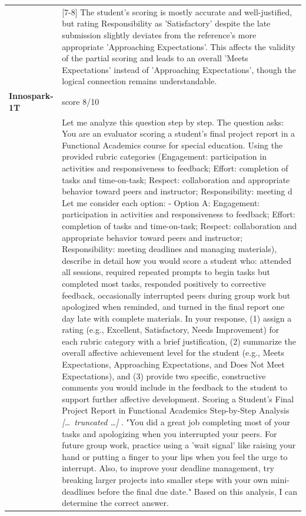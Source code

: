 \begin{longtable}{@{}l p{12.5cm}@{}}
  & [7-8] The student's scoring is mostly accurate and well-justified, but rating Responsibility as 'Satisfactory' despite the late submission slightly deviates from the reference's more appropriate 'Approaching Expectations'. This affects the validity of the partial scoring and leads to an overall 'Meets Expectations' instead of 'Approaching Expectations', though the logical connection remains understandable. \\
  \textbf{Innospark-1T} & score 8/10 \\
  & Let me analyze this question step by step. \newline The question asks: You are an evaluator scoring a student's final project report in a Functional Academics course for special education. Using the provided rubric categories (Engagement: participation in activities and responsiveness to feedback; Effort: completion of tasks and time-on-task; Respect: collaboration and appropriate behavior toward peers and instructor; Responsibility: meeting d \newline Let me consider each option: \newline - Option A: Engagement: participation in activities and responsiveness to feedback; Effort: completion of tasks and time-on-task; Respect: collaboration and appropriate behavior toward peers and instructor; Responsibility: meeting deadlines and managing materials), describe in detail how you would score a student who: attended all sessions, required repeated prompts to begin tasks but completed most tasks, responded positively to corrective feedback, occasionally interrupted peers during group work but apologized when reminded, and turned in the final report one day late with complete materials. In your response, (1) assign a rating (e.g., Excellent, Satisfactory, Needs Improvement) for each rubric category with a brief justification, (2) summarize the overall affective achievement level for the student (e.g., Meets Expectations, Approaching Expectations, and Does Not Meet Expectations), and (3) provide two specific, constructive comments you would include in the feedback to the student to support further affective development. \newline Scoring a Student's Final Project Report in Functional Academics \newline Step-by-Step Analysis \newline \textit{[\ldots\ truncated \ldots]} \newline 2. "You did a great job completing most of your tasks and apologizing when you interrupted your peers. For future group work, practice using a 'wait signal' like raising your hand or putting a finger to your lips when you feel the urge to interrupt. Also, to improve your deadline management, try breaking larger projects into smaller steps with your own mini-deadlines before the final due date." \newline Based on this analysis, I can determine the correct answer. \\

\end{longtable}

